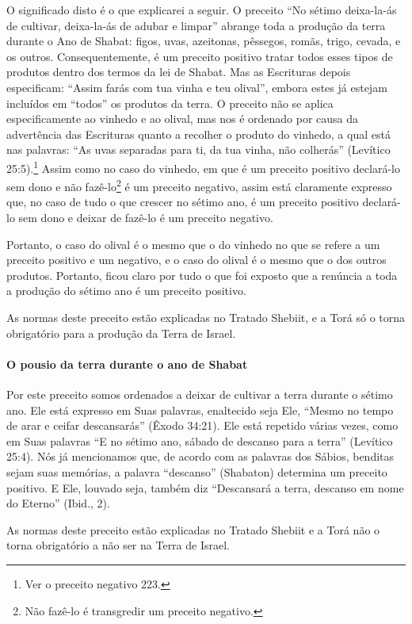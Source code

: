 O significado disto é o que explicarei a seguir. O preceito ``No sétimo
deixa-la-ás de cultivar, deixa-la-ás de adubar e limpar'' abrange toda a
produção da terra durante o Ano de Shabat: figos, uvas, azeitonas,
pêssegos, romãs, trigo, cevada, e os outros. Consequentemente, é um
preceito positivo tratar todos esses tipos de produtos dentro dos
termos da lei de Shabat. Mas as Escrituras depois especificam: ``Assim
farás com tua vinha e teu olival'', embora estes já estejam incluídos
em ``todos'' os produtos da terra. O preceito não se aplica
especificamente ao vinhedo e ao olival, mas nos é ordenado por causa
da advertência das Escrituras quanto a recolher o produto do vinhedo, a
qual está nas palavras: ``As uvas separadas para ti, da tua vinha, não
colherás'' (Levítico 25:5).\footnote{Ver o preceito negativo 223.} Assim como no caso do vinhedo, em que é
um preceito positivo declará-lo sem dono e não
fazê-lo\footnote{Não fazê-lo é transgredir um preceito negativo.} é um preceito negativo, assim está claramente expresso que, no caso de tudo o que crescer no sétimo ano, é um preceito positivo declará-lo sem dono e deixar de fazê-lo é um preceito negativo.

Portanto, o caso do olival é o mesmo que o do vinhedo no que se refere a
um preceito positivo e um negativo, e o caso do olival é o mesmo que o
dos outros produtos. Portanto, ficou claro por tudo o que foi exposto
que a renúncia a toda a produção do sétimo ano é um preceito positivo.

As normas deste preceito estão explicadas no Tratado Shebiit, e a Torá
só o torna obrigatório para a produção da Terra de Israel.

\paragraph{O pousio da terra durante o ano de Shabat}

Por este preceito somos ordenados a deixar de cultivar a terra durante
o sétimo ano. Ele está expresso em Suas palavras, enaltecido seja Ele,
``Mesmo no tempo de arar e ceifar descansarás'' (Êxodo 34:21). Ele está
repetido várias vezes, como em Suas palavras ``E no sétimo ano, sábado
de descanso para a terra'' (Levítico 25:4). Nós já mencionamos que, de
acordo com as palavras dos Sábios, benditas sejam suas memórias, a
palavra ``descanso'' (Shabaton) determina um preceito positivo. E Ele,
louvado seja, também diz ``Descansará a terra, descanso em nome do
Eterno'' (Ibid., 2).

As normas deste preceito estão explicadas no Tratado Shebiit e a Torá
não o torna obrigatório a não ser na Terra de Israel.

